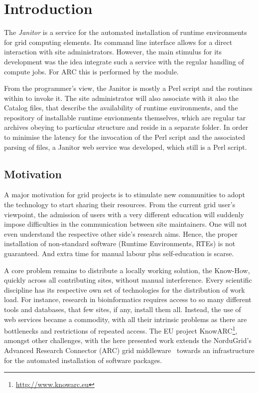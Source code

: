 \chapter{Introduction}

The {\em Janitor} is a service for the automated installation of runtime
environments for grid computing elements.  Its command line interface
allows for a direct interaction with site administrators. However, the
main stimulus for its development was the idea integrate such a service
with the regular handling of compute jobs. For ARC this is performed by
the \AREX module.

From the programmer's view, the Janitor is mostly a Perl script and the routines within \AREX to invoke it. The
site administrator will also associate with it also the Catalog files, that describe the availability of runtime
environments, and the repository of installable runtime envionments themselves, which are regular tar archives obeying
to particular structure and reside in a separate folder. In order to minimise the latency for the invocation of
the Perl script and the associated parsing of files, a Janitor web service was developed, which still is a Perl
script.

\section{Motivation}

A major motivation for grid projects is to stimulate new communities
to adopt the technology to start sharing their resources. From the
current grid user's viewpoint, the admission of users with a very different
education will suddenly impose difficulties in the communication between
site maintainers. One will not even understand the respective other side's
research aims. Hence, the proper installation of non-standard software
(Runtime Environments, RTEs) is not guaranteed. And extra time for manual
labour plus self-education is scarse.

A core problem remains to distribute a locally working solution, the
Know-How, quickly across all contributing sites, \ie without manual
interference. Every scientific discipline has its respective own
set of technologies for the distribution of work load. For instance,
research in bioinformatics requires access to so many different tools
and databases, that few sites, if any, install them all. Instead, the use
of web services became a commodity, with all their intrinsic problems as
there are bottlenecks and restrictions of repeated access.  The EU project
KnowARC\footnote{\href{http://www.knowarc.eu}{http://www.knowarc.eu}},
amongst other challenges, with the here presented work
extends the NorduGrid's Advanced Research Connector (ARC) grid
middleware~\cite{ELLERT_2007} towards an infrastructure for the
automated installation of software packages.

